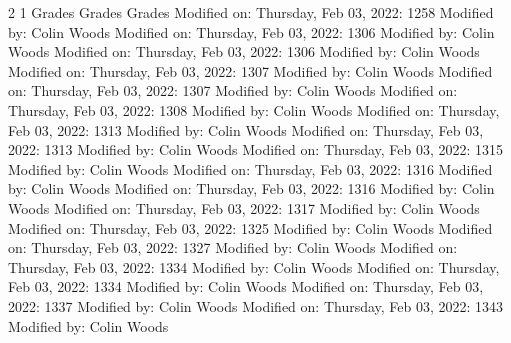 2
1
Grades
Grades Grades
Modified on: Thursday, Feb 03, 2022: 1258
Modified by: Colin Woods
Modified on: Thursday, Feb 03, 2022: 1306
Modified by: Colin Woods
Modified on: Thursday, Feb 03, 2022: 1306
Modified by: Colin Woods
Modified on: Thursday, Feb 03, 2022: 1307
Modified by: Colin Woods
Modified on: Thursday, Feb 03, 2022: 1307
Modified by: Colin Woods
Modified on: Thursday, Feb 03, 2022: 1308
Modified by: Colin Woods
Modified on: Thursday, Feb 03, 2022: 1313
Modified by: Colin Woods
Modified on: Thursday, Feb 03, 2022: 1313
Modified by: Colin Woods
Modified on: Thursday, Feb 03, 2022: 1315
Modified by: Colin Woods
Modified on: Thursday, Feb 03, 2022: 1316
Modified by: Colin Woods
Modified on: Thursday, Feb 03, 2022: 1316
Modified by: Colin Woods
Modified on: Thursday, Feb 03, 2022: 1317
Modified by: Colin Woods
Modified on: Thursday, Feb 03, 2022: 1325
Modified by: Colin Woods
Modified on: Thursday, Feb 03, 2022: 1327
Modified by: Colin Woods
Modified on: Thursday, Feb 03, 2022: 1334
Modified by: Colin Woods
Modified on: Thursday, Feb 03, 2022: 1334
Modified by: Colin Woods
Modified on: Thursday, Feb 03, 2022: 1337
Modified by: Colin Woods
Modified on: Thursday, Feb 03, 2022: 1343
Modified by: Colin Woods
